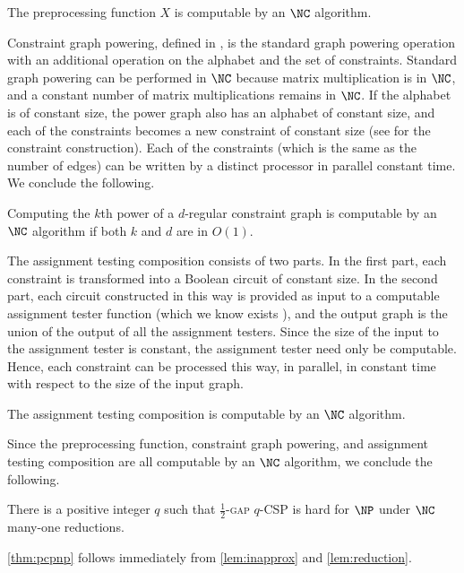 \begin{lemma}
  The preprocessing function $X$ is computable by an $\NC$ algorithm.
\end{lemma}

Constraint graph powering, defined in \autocite[Section~1.2]{dinur07}, is the standard graph powering operation with an additional operation on the alphabet and the set of constraints.
Standard graph powering can be performed in $\NC$ because matrix multiplication is in $\NC$, and a constant number of matrix multiplications remains in $\NC$.
If the alphabet is of constant size, the power graph also has an alphabet of constant size, and each of the constraints becomes a new constraint of constant size (see \autocite[Section~1.2]{dinur07} for the constraint construction).
Each of the constraints (which is the same as the number of edges) can be written by a distinct processor in parallel constant time.
We conclude the following.

\begin{lemma}
  Computing the $k$th power of a $d$-regular constraint graph is computable by an $\NC$ algorithm if both $k$ and $d$ are in $O(1)$.
\end{lemma}

The assignment testing composition \autocite[Definition~5.1]{dinur07} consists of two parts.
In the first part, each constraint is transformed into a Boolean circuit of constant size.
In the second part, each circuit constructed in this way is provided as input to a computable assignment tester function (which we know exists \autocite[Theorem~5.1]{dinur07}), and the output graph is the union of the output of all the assignment testers.
Since the size of the input to the assignment tester is constant, the assignment tester need only be computable.
Hence, each constraint can be processed this way, in parallel, in constant time with respect to the size of the input graph.

\begin{lemma}
  The assignment testing composition is computable by an $\NC$ algorithm.
\end{lemma}

Since the preprocessing function, constraint graph powering, and assignment testing composition are all computable by an $\NC$ algorithm, we conclude the following.

\begin{lemma}\label{lem:reduction}
  There is a positive integer $q$ such that \textsc{$\frac{1}{2}$-gap $q$-CSP} is hard for $\NP$ under $\NC$ many-one reductions.
\end{lemma}

\autoref{thm:pcpnp} follows immediately from \autoref{lem:inapprox} and \autoref{lem:reduction}.
